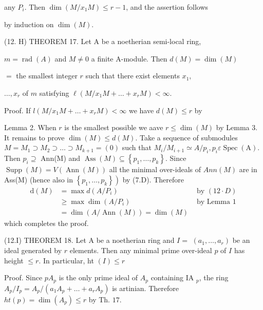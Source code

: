 any $P_{i}$. Then $\operatorname{dim}\left(M / x_{1} M\right) \leqslant r-1$, and the assertion follows

by induction on $\operatorname{dim}(M)$.

(12. H) THEOREM 17. Let A be a noetherian semi-local ring,

$m=\operatorname{rad}(A)$ and $M \neq 0$ a finite A-module. Then $d(M)=\operatorname{dim}(M)$

$=$ the smallest integer $r$ such that there exist elements $x_{1}$,

$\ldots, x_{r}$ of $m$ satisfying $\ell\left(M / x_{1} M+\ldots+x_{r} M\right)<\infty .$

Proof. If $l\left(M / x_{1} M+\ldots+x_{r} M\right)<\infty$ we have $d(M) \leqslant r$ by

Lemma 2. When $r$ is the smallest possible we aave $r \leqslant \operatorname{dim}(M)$ by Lemma 3. It remains to prove $\operatorname{dim}(M) \leqslant d(M)$. Take a sequence of submodules $M=M_{1} \supset M_{2} \supset \ldots \supset M_{k+1}=(0)$ such that $M_{i} / M_{i+1} \simeq A / p_{i}, p_{i} \varepsilon \operatorname{Spec}(\mathrm{A}) .$ Then $p_{i} \supseteq$ Ann(M) and $\operatorname{Ass}(M) \subseteq\left\{p_{1}, \ldots, p_{k}\right\}$. Since $\operatorname{Supp}(M)=V(\operatorname{Ann}(M))$ all the minimal over-ideals of $A n n(M)$ are in Ass(M) (hence also in $\left.\left\{p_{1}, \ldots, p_{k}\right\}\right)$ by (7.D). Therefore
$$
\begin{array}{rlr}
\mathrm{d}(M) & =\max d\left(A / P_{i}\right) & \text { by }(12 \cdot D) \\
& \geqslant \max \operatorname{dim}\left(A / P_{i}\right) & \text { by Lemma } 1 \\
& =\operatorname{dim}(A / \operatorname{Ann}(M))=\operatorname{dim}(M)
\end{array}
$$
which completes the proof.

(12.I) THEOREM 18. Let A be a noetherian ring and $I=$ $\left(a_{1}, \ldots, a_{r}\right)$ be an ideal generated by $r$ elements. Then any minimal prime over-ideal $p$ of $I$ has height $\leqslant r$. In particular, ht $(I) \leqslant r$

Proof. Since $p A_{p}$ is the only prime ideal of $A_{p}$ containing IA $_{p}$, the ring $A_{p} / I_{p}=A_{p} /\left(a_{1} A_{p}+\ldots+a_{r} A_{p}\right)$ is artinian. Therefore $h t(p)=\operatorname{dim}\left(A_{p}\right) \leqslant r$ by Th. $17 .$


